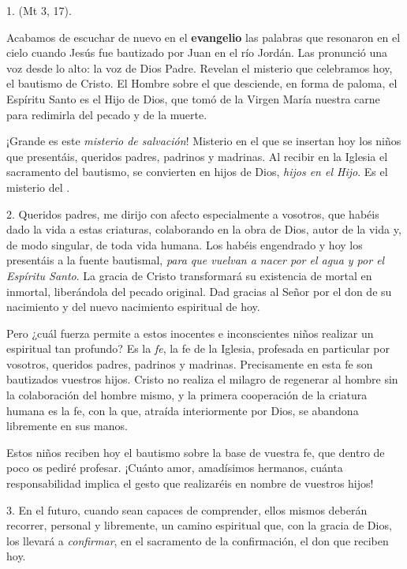 				\begin{body}
					1.  (Mt 3, 17).
					
					Acabamos de escuchar de nuevo en el \textbf{evangelio} las palabras que resonaron en el cielo cuando Jesús fue bautizado por Juan en el río Jordán. Las pronunció una voz desde lo alto: la voz de Dios Padre. Revelan el misterio que celebramos hoy, el bautismo de Cristo. El Hombre sobre el que desciende, en forma de paloma, el Espíritu Santo es el Hijo de Dios, que tomó de la Virgen María nuestra carne para redimirla del pecado y de la muerte.
					
					¡Grande es este \emph{misterio de salvación}! Misterio en el que se insertan hoy los niños que presentáis, queridos padres, padrinos y madrinas. Al recibir en la Iglesia el sacramento del bautismo, se convierten en hijos de Dios, \emph{hijos en el Hijo}. Es el misterio del .
					
					2. Queridos padres, me dirijo con afecto especialmente a vosotros, que habéis dado la vida a estas criaturas, colaborando en la obra de Dios, autor de la vida y, de modo singular, de toda vida humana. Los habéis engendrado y hoy los presentáis a la fuente bautismal, \emph{para que vuelvan a nacer por el agua y por el Espíritu Santo}. La gracia de Cristo transformará su existencia de mortal en inmortal, liberándola del pecado original. Dad gracias al Señor por el don de su nacimiento y del nuevo nacimiento espiritual de hoy.
					
					Pero ¿cuál fuerza permite a estos inocentes e inconscientes niños realizar un  espiritual tan profundo? Es la \emph{fe}, la fe de la Iglesia, profesada en particular por vosotros, queridos padres, padrinos y madrinas. Precisamente en esta fe son bautizados vuestros hijos. Cristo no realiza el milagro de regenerar al hombre sin la colaboración del hombre mismo, y la primera cooperación de la criatura humana es la fe, con la que, atraída interiormente por Dios, se abandona libremente en sus manos.
					
					Estos niños reciben hoy el bautismo sobre la base de vuestra fe, que dentro de poco os pediré profesar. ¡Cuánto amor, amadísimos hermanos, cuánta responsabilidad implica el gesto que realizaréis en nombre de vuestros hijos!
					
					3. En el futuro, cuando sean capaces de comprender, ellos mismos deberán recorrer, personal y libremente, un camino espiritual que, con la gracia de Dios, los llevará a \emph{confirmar}, en el sacramento de la confirmación, el don que reciben hoy.
					

\end{body}
